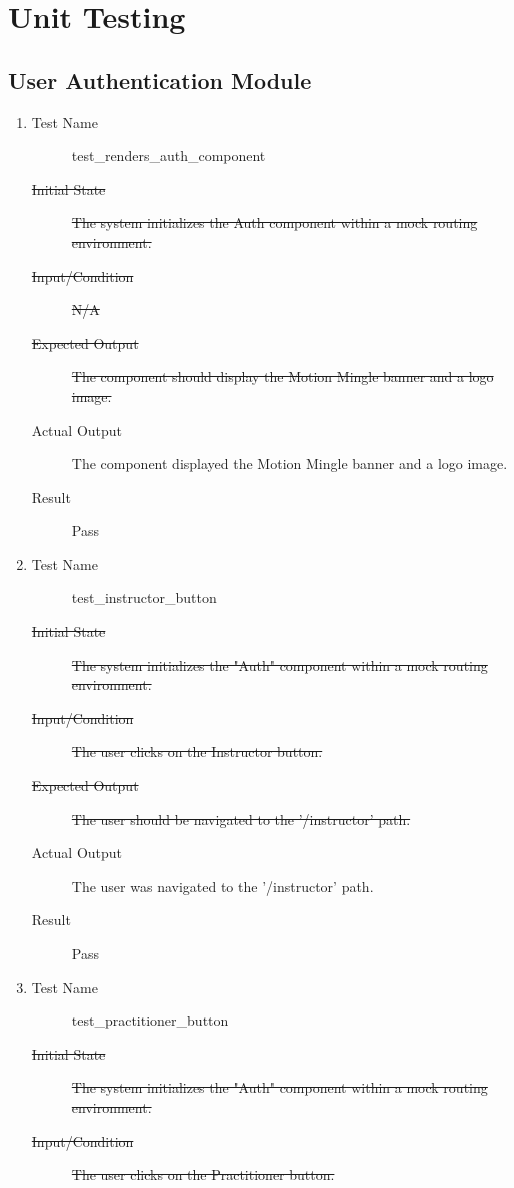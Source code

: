 \documentclass[12pt, titlepage]{article}
\begin{document}
\section{Unit Testing}
\subsection{User Authentication Module}
\begin{enumerate}[UT-UA1]
\item \label{UT-UA1}
  \begin{description}
  \item[Test Name] test\_renders\_auth\_component
  \item[\sout{Initial State}]\sout{ The system initializes the Auth component within a mock
    routing environment.
  }\item[\sout{Input/Condition}]\sout{ N/A
  }\item[\sout{Expected Output}]\sout{ The component should display the Motion Mingle banner
    and a logo image.
  }\item[Actual Output] The component displayed the Motion Mingle banner and a
    logo image.
  \item[Result] Pass
  \end{description}
\item \label{UT-UA2}
  \begin{description}
  \item[Test Name] test\_instructor\_button
  \item[\sout{Initial State}]\sout{ The system initializes the "Auth" component within a mock
    routing environment.
  }\item[\sout{Input/Condition}]\sout{ The user clicks on the Instructor button.
  }\item[\sout{Expected Output}]\sout{ The user should be navigated to the '/instructor' path.
  }\item[Actual Output] The user was navigated to the '/instructor' path.
  \item[Result] Pass
  \end{description}
\item \label{UT-UA3}
  \begin{description}
  \item[Test Name] test\_practitioner\_button
  \item[\sout{Initial State}]\sout{ The system initializes the "Auth" component within a mock
    routing environment.
  }\item[\sout{Input/Condition}]\sout{ The user clicks on the Practitioner button.
}
\end{description}
\end{enumerate}
\end{document}
